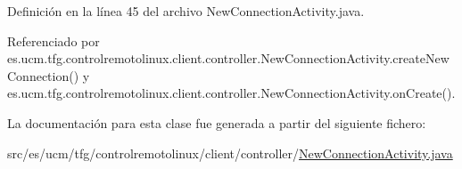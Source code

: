 Definición en la línea 45 del archivo New\-Connection\-Activity.\-java.



Referenciado por es.\-ucm.\-tfg.\-controlremotolinux.\-client.\-controller.\-New\-Connection\-Activity.\-create\-New\-Connection() y es.\-ucm.\-tfg.\-controlremotolinux.\-client.\-controller.\-New\-Connection\-Activity.\-on\-Create().



La documentación para esta clase fue generada a partir del siguiente fichero\-:\begin{DoxyCompactItemize}
\item 
src/es/ucm/tfg/controlremotolinux/client/controller/\hyperlink{NewConnectionActivity_8java}{New\-Connection\-Activity.\-java}\end{DoxyCompactItemize}
